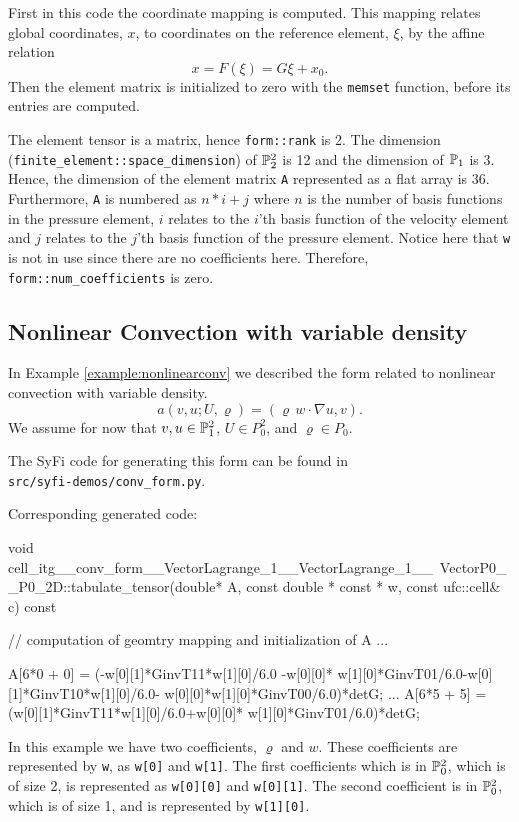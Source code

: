 First in this code the coordinate mapping is 
computed. 
This mapping relates global coordinates, $x$, to coordinates
on the reference element, $\xi$,  by the affine relation 
\[
x = F(\xi) = G \xi + x_0. 
\]
Then the element matrix is initialized to zero with the \texttt{memset}
function, before its entries are computed. 

The element tensor is a matrix, hence \texttt{form::rank} is 2.
The dimension (\texttt{finite\_element::space\_dimension}) 
of  $\P^2_2$ is 12 and the dimension of $\P_1$ is 3.    
Hence, the dimension of the element matrix \texttt{A} represented as a    
flat array is 36.   
Furthermore, \texttt{A} is numbered as $n*i + j$ where
$n$ is the number of basis functions in the pressure element, 
$i$ relates to the $i$'th basis function of the velocity element and
$j$ relates to the $j$'th basis function of the pressure element. 
Notice here that \texttt{w} is not in use since there are no coefficients here. 
Therefore, \texttt{form::num\_coefficients} is zero.

\subsection{Nonlinear Convection with variable density} 
In Example \ref{example:nonlinearconv} we described the
form related to nonlinear convection with variable density. 
\begin{equation}
a(v,u; U,\varrho) = ( \varrho \, w \cdot \nabla  u, v). 
\end{equation}
We assume for now that 
$v, u \in \P_1^2$, $U\in P_0^2$, and  $\varrho \in P_0$.

The SyFi code for generating this form can be found in \\
\texttt{src/syfi-demos/conv\_form.py}.

Corresponding generated code: 
\begin{code}
void cell_itg__conv_form__VectorLagrange_1__VectorLagrange_1__\
     VectorP0__P0_2D::tabulate_tensor(double* A, 
     const double * const * w, const ufc::cell& c) const
{
  // computation of geomtry mapping and initialization of A ...
  
  A[6*0 + 0] = (-w[0][1]*GinvT11*w[1][0]/6.0 -w[0][0]*
      w[1][0]*GinvT01/6.0-w[0][1]*GinvT10*w[1][0]/6.0-
      w[0][0]*w[1][0]*GinvT00/6.0)*detG;
   ...
  A[6*5 + 5] = (w[0][1]*GinvT11*w[1][0]/6.0+w[0][0]*
      w[1][0]*GinvT01/6.0)*detG;
}
\end{code}

In this example we have two coefficients, $\varrho$ and $w$. These 
coefficients are represented by \texttt{w}, as \texttt{w[0]} and \texttt{w[1]}. The first coefficients
which is in $\P_0^2$, which is of size 2, is represented as 
\texttt{w[0][0]} and \texttt{w[0][1]}. The second coefficient 
is in $\P_0^2$, which is of size 1, and is represented by \texttt{w[1][0]}.  

